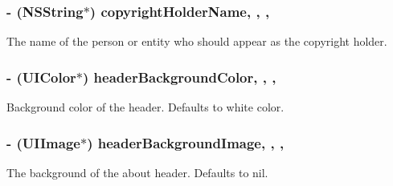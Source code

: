 \subsubsection[{copyright\+Holder\+Name}]{\setlength{\rightskip}{0pt plus 5cm}-\/ (N\+S\+String$\ast$) copyright\+Holder\+Name\hspace{0.3cm}{\ttfamily [read]}, {\ttfamily [write]}, {\ttfamily [nonatomic]}, {\ttfamily [strong]}}\label{interface_r_f_about_view_controller_af0339e5ce8d105d3f50a48fb590a4cb4}
The name of the person or entity who should appear as the copyright holder. \hypertarget{interface_r_f_about_view_controller_aa5bb3fda6aa7a1a085b0c9e846f67563}{}
\subsubsection[{header\+Background\+Color}]{\setlength{\rightskip}{0pt plus 5cm}-\/ (U\+I\+Color$\ast$) header\+Background\+Color\hspace{0.3cm}{\ttfamily [read]}, {\ttfamily [write]}, {\ttfamily [nonatomic]}, {\ttfamily [strong]}}\label{interface_r_f_about_view_controller_aa5bb3fda6aa7a1a085b0c9e846f67563}
Background color of the header. Defaults to white color. \hypertarget{interface_r_f_about_view_controller_aee705d94eff74be1f13784f1ffefc2df}{}
\subsubsection[{header\+Background\+Image}]{\setlength{\rightskip}{0pt plus 5cm}-\/ (U\+I\+Image$\ast$) header\+Background\+Image\hspace{0.3cm}{\ttfamily [read]}, {\ttfamily [write]}, {\ttfamily [nonatomic]}, {\ttfamily [strong]}}\label{interface_r_f_about_view_controller_aee705d94eff74be1f13784f1ffefc2df}
The background of the about header. Defaults to nil. \hypertarget{interface_r_f_about_view_controller_ad1c77f147663e58a79c328e4f3cf0d7b}{}
